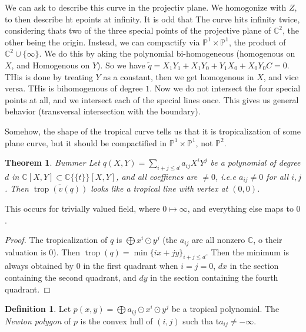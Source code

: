 \documentclass[11pt]{article}
\newtheorem{prototheorem}{Theorem}[section]
\newenvironment{theorem}
   {\begin{prototheorem}}
   {\end{prototheorem}}
\theoremstyle{definition}
\newtheorem{protodefinition}{Definition}[section]
\newenvironment{define}
   {\begin{protodefinition}}
   {\end{protodefinition}}
\def\CC{{\mathbb C}}
\def\PP{{\mathbb P}}
\DeclareMathOperator{\trop}{trop}
\begin{document}
We can ask to describe this curve in the projectiv plane. We homogonize with $Z$, to then describe ht epoints at infinity. It is odd that The curve hits infinity twice, considering thats two of the three special points of the projective plane of $\CC^2$, the other being the origin. Instead, we can compactify via $\PP^1\times \PP^1$, the product of $\CC^2\cup \{\infty\}$. We do this by aking the polynomial bi-homogeneous (homogenous on $X$, and Homogenous on $Y$). So we have $\tilde{q} = X_1Y_1 +X_1Y_0+Y_1X_0 + X_0Y_0C = 0$. THis is done by treating $Y$ as a constant, then we get homogenous in $X$, and vice versa. THis is bihomogenous of degree $1$. Now we do not intersect the four special points at all, and we intersect each of the special lines once. This gives us general behavior (transversal intersection with the boundary).

Somehow, the shape of the tropical curve tells us that it is tropicalization of some plane curve, but it should be compactified in $\PP^1\times \PP^1$, not $\PP^2$.





\begin{theorem}{Bummer}
    Let $q(X,Y)= \sum\limits_{i+j\leq d}a_{ij}X^iY^j$ be a polynomial of degree $d$ in $\CC[X,Y] \subset \CC\{\{t\}\} [X,Y]$, and all coeffiencs are $\neq 0$, i.e.e $a_{ij} \neq 0$ for all $i,j$. Then $\overline{\trop(v(q))}$ looks like a tropical line with vertex at $(0,0)$. 
\end{theorem}

This occurs for trivially valued field, where $0 \mapsto \infty$, and everything else maps to $0$.


\begin{proof}
    The tropicalization of $q$ is $\bigoplus x^i\odot y^j$ (the $a_{ij}$ are all nonzero $\CC$, o their valuation is $0$). Then $\trop(q) = \min\{ix+jy\}_{i+j\leq d}$. Then the minimum is always obtained by $0$ in the first quadrant when $i=j=0$, $dx$ in the section containing the second quadrant, and $dy$ in the section containing the fourth quadrant.
\end{proof}



\begin{define}
    Let $p(x,y) = \bigoplus a_{ij} \odot x^i\odot y^j$ be a tropical polynomial. The \emph{Newton polygon} of $p$ is the convex hull of $(i,j)$ such tha t$a_{ij} \neq - \infty$.
\end{define}
\end{document}

